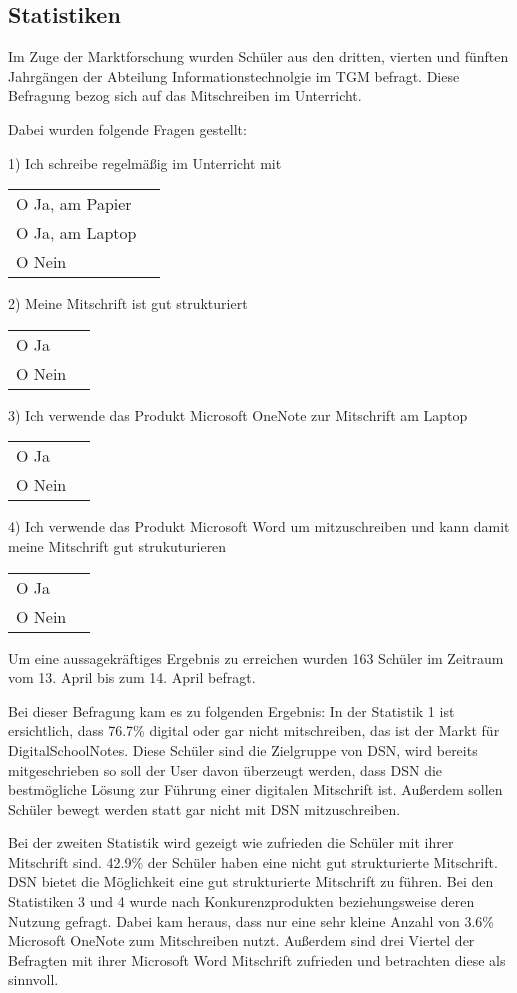 
\subsection{Statistiken}
Im Zuge der Marktforschung wurden Schüler aus den dritten, vierten und fünften Jahrgängen der Abteilung Informationstechnolgie im TGM befragt. Diese Befragung bezog sich auf das Mitschreiben im Unterricht. 

Dabei wurden folgende Fragen gestellt:

1) Ich schreibe regelmäßig im Unterricht mit\\
	\begin{tabular}[t]{lr}
	O Ja, am Papier\\
	O Ja, am Laptop\\
	O Nein
	\end{tabular}
	

2) Meine Mitschrift ist gut strukturiert\\
	\begin{tabular}[t]{lr}
	O Ja\\
	O Nein
	\end{tabular}

3) Ich verwende das Produkt Microsoft OneNote zur Mitschrift am Laptop\\
	\begin{tabular}[t]{lr}
	O Ja\\
	O Nein
	\end{tabular}
	
4) Ich verwende das Produkt Microsoft Word um mitzuschreiben und kann damit meine Mitschrift gut strukuturieren\\
	\begin{tabular}[t]{lr}
	O Ja\\
	O Nein
	\end{tabular}
	
Um eine aussagekräftiges Ergebnis zu erreichen wurden 163 Schüler im Zeitraum vom 13. April bis zum 14. April befragt.
\newpage

Bei dieser Befragung kam es zu folgenden Ergebnis:
In der Statistik 1 ist ersichtlich, dass 76.7\% digital oder gar nicht mitschreiben, das ist der Markt für DigitalSchoolNotes.
Diese Schüler sind die Zielgruppe von DSN, wird bereits mitgeschrieben so soll der User davon überzeugt werden, dass DSN die bestmögliche Lösung zur Führung einer digitalen Mitschrift ist. Außerdem sollen Schüler bewegt werden statt gar nicht mit DSN mitzuschreiben.

Bei der zweiten Statistik wird gezeigt wie zufrieden die Schüler mit ihrer Mitschrift sind. 42.9\% der Schüler haben eine nicht gut strukturierte Mitschrift. DSN bietet die Möglichkeit eine gut strukturierte Mitschrift zu führen. 
Bei den Statistiken 3 und 4 wurde nach Konkurenzprodukten beziehungsweise deren Nutzung gefragt. Dabei kam heraus, dass nur eine sehr kleine Anzahl von 3.6\% Microsoft OneNote zum Mitschreiben nutzt. Außerdem sind drei Viertel der Befragten mit ihrer Microsoft Word Mitschrift zufrieden und betrachten diese als sinnvoll. 
\newpage
